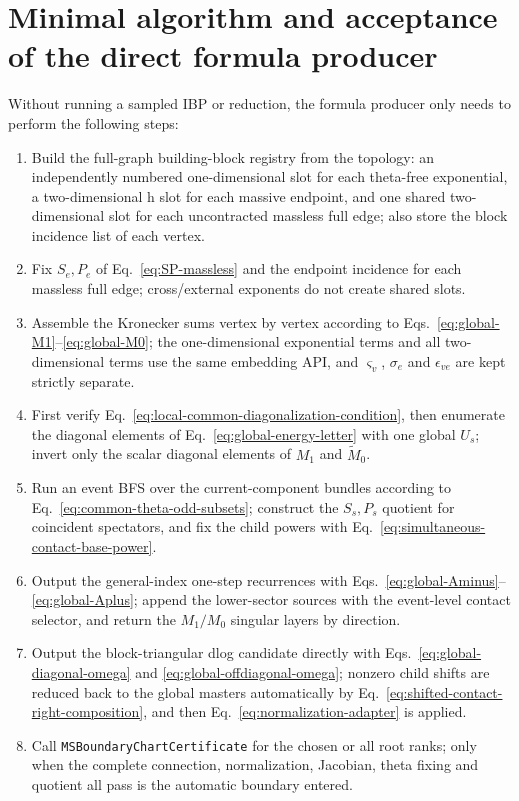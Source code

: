 \documentclass[11pt,a4paper]{article}
\begin{document}
\section{Minimal algorithm and acceptance of the direct formula producer}

Without running a sampled IBP or reduction, the formula producer only needs to perform the following steps:
\begin{enumerate}[label=\arabic*.]
  \item Build the full-graph building-block registry from the topology: an independently numbered one-dimensional slot for each theta-free exponential, a two-dimensional h slot for each massive endpoint, and one shared two-dimensional slot for each uncontracted massless full edge; also store the block incidence list of each vertex.
  \item Fix $S_e,P_e$ of Eq.~\eqref{eq:SP-massless} and the endpoint incidence for each massless full edge; cross/external exponents do not create shared slots.
  \item Assemble the Kronecker sums vertex by vertex according to Eqs.~\eqref{eq:global-M1}--\eqref{eq:global-M0}; the one-dimensional exponential terms and all two-dimensional terms use the same embedding API, and $\varsigma_v$, $\sigma_e$ and $\epsilon_{ve}$ are kept strictly separate.
  \item First verify Eq.~\eqref{eq:local-common-diagonalization-condition}, then enumerate the diagonal elements of Eq.~\eqref{eq:global-energy-letter} with one global $U_s$; invert only the scalar diagonal elements of $M_1$ and $\widetilde M_0$.
  \item Run an event BFS over the current-component bundles according to Eq.~\eqref{eq:common-theta-odd-subsets}; construct the $S_s,P_s$ quotient for coincident spectators, and fix the child powers with Eq.~\eqref{eq:simultaneous-contact-base-power}.
  \item Output the general-index one-step recurrences with Eqs.~\eqref{eq:global-Aminus}--\eqref{eq:global-Aplus}; append the lower-sector sources with the event-level contact selector, and return the $M_1/M_0$ singular layers by direction.
  \item Output the block-triangular dlog candidate directly with Eqs.~\eqref{eq:global-diagonal-omega} and \eqref{eq:global-offdiagonal-omega}; nonzero child shifts are reduced back to the global masters automatically by Eq.~\eqref{eq:shifted-contact-right-composition}, and then Eq.~\eqref{eq:normalization-adapter} is applied.
  \item Call \texttt{MSBoundaryChartCertificate} for the chosen or all root ranks; only when the complete connection, normalization, Jacobian, theta fixing and quotient all pass is the automatic boundary entered.
\end{enumerate}
\end{document}
